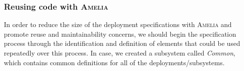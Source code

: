 \documentclass{article}
\newcommand\amelia[0]{\textsc{Amelia}}
\begin{document}

\subsubsection{Reusing code with \amelia{}}

In order to reduce the size of the deployment specifications with \amelia{} and promote reuse and maintainability concerns, we should begin the specification process through the identification and definition of elements that could be used repeatedly over this process. In case, we created a subsystem called \textit{Common}, which contains common definitions for all of the deployments/subsystems. \\   
\end{document}
